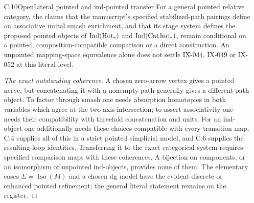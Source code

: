 \begin{result}{C.10}{Open}{Literal pointed and ind-pointed transfer}
For a general pointed relative category, the claims that the manuscript's specified stabilized-path pairings define an associative unital smash enrichment, and that its stage system defines the proposed pointed objects of $\operatorname{Ind}(\mathrm{Hot}_*)$ and $\operatorname{Ind}(\mathrm{Cat}\,\mathrm{hot}_*)$, remain conditional on a pointed, composition-compatible comparison or a direct construction. An unpointed mapping-space equivalence alone does not settle IX-044, IX-049 or IX-052 at this literal level.
\end{result}
\begin{proof}[The exact outstanding coherence]
A chosen zero-arrow vertex gives a pointed nerve, but concatenating it with a nonempty path generally gives a different path object. To factor through smash one needs absorption homotopies in both variables which agree at the two-axis intersection; to assert associativity one needs their compatibility with threefold concatenation and units. For an ind-object one additionally needs these choices compatible with every transition map. C.4 supplies all of this in a strict pointed simplicial model, and C.6 supplies the resulting loop identities. Transferring it to the exact categorical system requires specified comparison maps with these coherences. A bijection on components, or an isomorphism of unpointed ind-objects, provides none of them. The elementary cases $\Sigma=\operatorname{Iso}(M)$ and a chosen dg model have the evident discrete or enhanced pointed refinement; the general literal statement remains on the register.
\end{proof}
